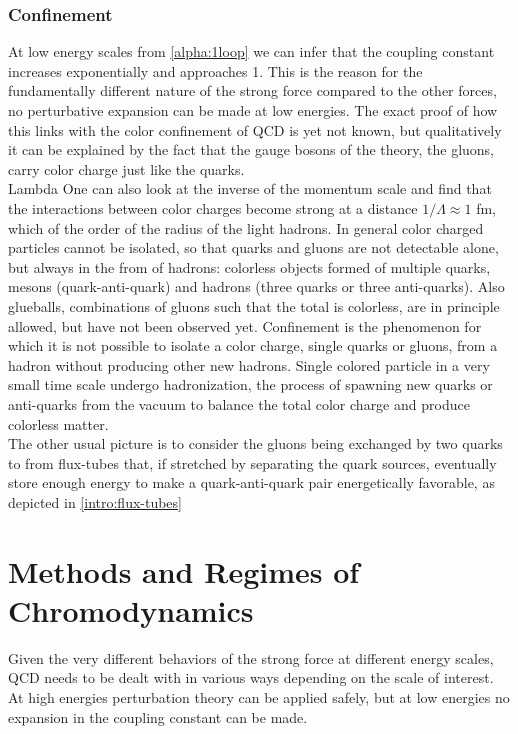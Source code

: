 \subsubsection{Confinement}
At low energy scales from \cref{alpha:1loop} we can infer that the coupling constant increases exponentially and approaches 1. This is the reason for the fundamentally different nature of the strong force compared to the other forces, no perturbative expansion can be made at low energies. The exact proof of how this links with the color confinement of QCD is yet not known, but qualitatively it can be explained by the fact that the gauge bosons of the theory, the gluons, carry color charge just like the quarks.\\Lambda
One can also look at the inverse of the momentum scale and find that the interactions between color charges become strong at a distance $1/\Lambda \approx 1$ fm, which of the order of the radius of the light hadrons.
In general color charged particles cannot be isolated, so that quarks and gluons are not detectable alone, but always in the from of hadrons: colorless objects formed of multiple quarks, mesons (quark-anti-quark) and hadrons (three quarks or three anti-quarks). Also glueballs, combinations of gluons such that the total is colorless, are in principle allowed, but have not been observed yet. Confinement is the phenomenon for which it is not possible to isolate a color charge, single quarks or gluons, from a hadron without producing other new hadrons. Single colored particle in a very small time scale undergo hadronization, the process of spawning new quarks or anti-quarks from the vacuum to balance the total color charge and produce colorless matter. \\
The other usual picture is to consider the gluons being exchanged by two quarks to from flux-tubes that, if stretched by separating the quark sources, eventually store enough energy to make a quark-anti-quark pair energetically favorable, as depicted in \cref{intro:flux-tubes}

\section{Methods and Regimes of Chromodynamics}
Given the very different behaviors of the strong force at different energy scales, QCD needs to be dealt with in various ways depending on the scale of interest. At high energies perturbation theory can be applied safely, but at low energies no expansion in the coupling constant can be made. 

